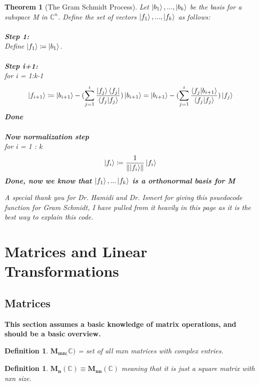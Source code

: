 \documentclass[12pt]{article}
\theoremstyle{plain}
\newtheorem{theorem}[lemma]{Theorem}
\theoremstyle{nonumberplain}
\theoremstyle{plain}
\newtheorem{definition}[lemma]{Definition}
\theoremstyle{nonumberplain}
\newcommand\1{{\bf 1}}
\newcommand{\C}{\mathbb{C}} %
\newcommand{\<}{\left\langle}
\renewcommand{\>}{\right\rangle}
\newcommand{\norm}[1]{\left\lVert#1\right\rVert} %
\begin{document}
\pagebreak
\begin{theorem} [The Gram Schmidt Process]
Let {$\ket{b_1}, ... , \ket{b_k}$} be the basis for a subspace M in $\C^n$. Define the set of vectors {$\ket{f_1}, ... , \ket{f_k}$} as follows:\\
\\
\textbf{Step 1:} \\
Define $\ket{f_1} \coloneqq \ket{b_1}$.\\\\
\textbf{Step i+1:} \\
for i = 1:k-1\\
\begin{equation}
\ket{f_{i+1}} \coloneqq \ket{b_{i+1}} - (\sum_{j=1}^{i}  {\frac{\ket{f_j}\bra{f_j}}{\braket{f_j|f_j}}})\ket{b_{i+1}} = \ket{b_{i+1}} - (\sum_{j=1}^{i}  {\frac{\braket{f_j|b_{i+1}}}{\braket{f_j|f_j}}})\ket{f_j}
\end{equation}
\textbf{\textit{Done}}\\\\
\textbf{Now normalization step}\\
for i = 1 : k
\begin{equation}
\ket{f_i} \coloneqq \frac{1}{\norm{\ket{f_i}}}\ket{f_i}
\end{equation}
\textbf{\textit{Done, now we know that $\ket{f_1}, ... \ket{f_k}$ is a orthonormal basis for M}}
\end{theorem}

\textit{A special thank you for Dr. Hamidi and Dr. Ismert for giving this psuedocode function for Gram Schmidt, I have pulled from it heavily in this page as it is the best way to explain this code.}
\pagebreak

\section{Matrices and Linear Transformations}
\subsection{Matrices} \textbf{This section assumes a basic knowledge of matrix operations, and should be a basic overview.}

\begin{definition}
$\mathbf{M_{mn(}\C)}$ = set of all mxn matrices with complex entries.
\end{definition}

\begin{definition}
$\mathbf{M_n(\C) \equiv M_{nn}(\C)}$ meaning that it is just a square matrix with nxn size.  
\end{definition}
\end{document}
